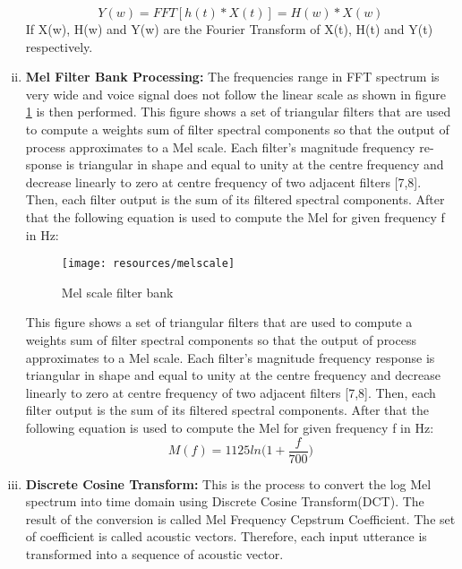 \begin{enumerate}[(i)]
                \begin{equation}
                        Y(w) = FFT[h(t)*X(t)] = H(w) * X(w)
                \end{equation}
                If X(w), H(w) and Y(w) are the Fourier Transform of X(t), H(t) and Y(t) respectively.
        \item \textbf{Mel Filter Bank Processing:}
                The frequencies range in FFT spectrum is very wide
                and voice signal does not follow the linear scale as shown in figure \ref{fig:Melscale} is then
                performed. This figure shows a set of triangular filters that are used to
                compute a weights sum of filter spectral components so that the output of
                process approximates to a Mel scale. Each filter’s magnitude frequency re-
                sponse is triangular in shape and equal to unity at the centre frequency and
                decrease linearly to zero at centre frequency of two adjacent filters [7,8].
                Then, each filter output is the sum of its filtered spectral components. After
                that the following equation is used to compute the Mel for given frequency
                f in Hz:
                \begin{figure}[h!]
                        \centering
                        \texttt{[image: resources/melscale]}
                        \caption{Mel scale filter bank}
                        \label{fig:Melscale}
                \end{figure}
                This figure shows a set of triangular filters that are used to compute a weights sum of filter spectral components so that the output
                of process approximates to a Mel scale. Each filter's magnitude frequency response is triangular in shape and equal to unity at the
                centre frequency and decrease linearly to zero at centre frequency of two adjacent filters [7,8]. Then, each filter output is the sum of its
                filtered spectral components. After that the following equation is used to compute the Mel for given frequency f in Hz:
                \begin{equation}
                        M(f) = 1125ln\Big(1+\frac{f}{700}\Big)
                \end{equation}
        \item \textbf{Discrete Cosine Transform:}
                This is the process to convert the log Mel spectrum into time domain using Discrete Cosine Transform(DCT). The result of the conversion is
                called Mel Frequency Cepstrum Coefficient. The set of coefficient is called acoustic vectors. Therefore, each input utterance is transformed
                into a sequence of acoustic vector.
\end{enumerate}

